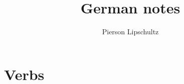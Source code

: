 \documentclass{article}
\title{German notes}
\author{Pierson Lipschultz}
\begin{document}
\maketitle

\section{Verbs}
\end{document}
